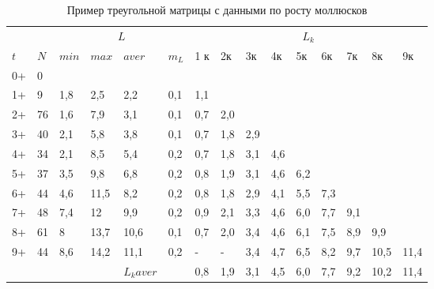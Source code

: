 \begin{table}[h]
        \caption{Пример треугольной матрицы с данными по росту моллюсков}
        \label{tab:rost_matrica_primer}
        \begin{tabularx}{\textwidth}{|X|X|XX|XX|XXXXXXXXX|}
        \hline
        &    & \multicolumn{4}{c|}{$L$}               & \multicolumn{9}{c|}{$L_{k}$} \\ 
        $t$     & $N$  & $min$ & $max$ & $aver$ & $m_{L}$   & 1 к & 2к  & 3к  & 4к  & 5к  & 6к  & 7к  & 8к   & 9к   \\ \hline
        0+      & 0  &       &       &         &         &     &     &     &     &     &     &     &      &      \\
        1+      & 9  & 1,8   & 2,5   & 2,2     & 0,1     & 1,1 &     &     &     &     &     &     &      &      \\
        2+      & 76 & 1,6   & 7,9   & 3,1     & 0,1     &\cellcolor{yellow}0,7 & \cellcolor{yellow}2,0 &     &     &     &     &     &      &      \\
        3+      & 40 & 2,1   & 5,8   & 3,8     & 0,1     & 0,7 & 1,8 & 2,9 &     &     &     &     &      &      \\
        4+      & 34 & 2,1   & 8,5   & 5,4     & 0,2     & 0,7 & 1,8 & 3,1 & 4,6 &     &     &     &      &      \\
        5+      & 37 & 3,5   & 9,8   & 6,8     & 0,2     & 0,8 & 1,9 & 3,1 & 4,6 & 6,2 &     &     &      &      \\
        6+      & 44 & 4,6   & 11,5  & 8,2     & 0,2     & 0,8 & 1,8 & 2,9 & 4,1 & 5,5 & 7,3 &     &      &      \\
        7+      & 48 & 7,4   & 12    & 9,9     & 0,2     & 0,9 & 2,1 & 3,3 & 4,6 & 6,0 & 7,7 & 9,1 &      &      \\
        8+      & 61 & 8     & 13,7  & 10,6    & 0,1     & \cellcolor{red}0,7 & \cellcolor{red}2,0 & \cellcolor{red}3,4 & \cellcolor{red}4,6 & \cellcolor{red}6,1 & \cellcolor{red}7,5 & \cellcolor{red}8,9 & \cellcolor{red}9,9  &      \\
        9+      & 44 & 8,6   & 14,2  & 11,1    & 0,2     & -   & -   & 3,4 & 4,7 & 6,5 & 8,2 & 9,7 & 10,5 & 11,4 \\ \hline
                &    &       &       & $L_{k} aver$  &  & \cellcolor{blue}0,8 & \cellcolor{blue}1,9 & \cellcolor{blue}3,1 & \cellcolor{blue}4,5 & \cellcolor{blue}6,0 & \cellcolor{blue}7,7 & \cellcolor{blue}9,2 & \cellcolor{blue}10,2 & \cellcolor{blue}11,4 \\

\end{tabularx}
\end{table}

